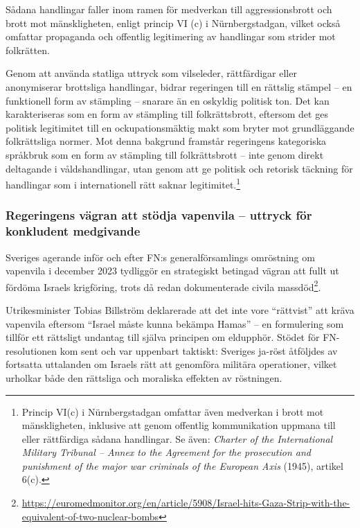 Sådana handlingar faller inom ramen för medverkan till aggressionsbrott och brott mot mänskligheten, enligt princip VI (c) i Nürnbergstadgan, 
vilket också omfattar propaganda och offentlig legitimering av handlingar som strider mot folkrätten.

Genom att använda statliga uttryck som vilseleder, rättfärdigar eller anonymiserar brottsliga handlingar, bidrar regeringen till en 
rättslig stämpel – en funktionell form av stämpling – snarare än en oskyldig politisk ton. 
Det kan karakteriseras som en form av stämpling till folkrättsbrott, eftersom det ges politisk legitimitet 
till en ockupationsmäktig makt som bryter mot grundläggande folkrättsliga normer.
Mot denna bakgrund framstår regeringens kategoriska språkbruk som en form av stämpling till 
folkrättsbrott – inte genom direkt deltagande i våldshandlingar, utan genom att ge politisk och retorisk 
täckning för handlingar som i internationell rätt saknar legitimitet.\footnote{Princip VI(c) i Nürnbergstadgan omfattar även medverkan i brott mot mänskligheten, inklusive att genom offentlig kommunikation uppmana till eller rättfärdiga sådana handlingar. Se även: \textit{Charter of the International Military Tribunal – Annex to the Agreement for the prosecution and punishment of the major war criminals of the European Axis} (1945), artikel 6(c).}




\subsubsection{Regeringens vägran att stödja vapenvila – uttryck för konkludent medgivande}

Sveriges agerande inför och efter FN:s generalförsamlings omröstning om vapenvila i december 2023 tydliggör en strategiskt betingad vägran att fullt ut fördöma Israels krigföring, trots då redan dokumenterade civila massdöd\footnote{\url{https://euromedmonitor.org/en/article/5908/Israel-hits-Gaza-Strip-with-the-equivalent-of-two-nuclear-bombs}}.

Utrikesminister Tobias Billström deklarerade att det inte vore “rättvist” att kräva vapenvila eftersom “Israel måste kunna bekämpa Hamas” – en formulering som tillför ett rättsligt undantag till själva principen om eldupphör. Stödet för FN-resolutionen kom sent och var uppenbart taktiskt: Sveriges ja-röst åtföljdes av fortsatta uttalanden om Israels rätt att genomföra militära operationer, vilket urholkar både den rättsliga och moraliska effekten av röstningen.

